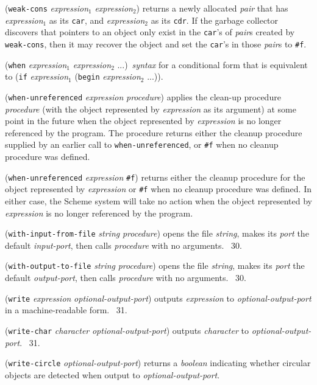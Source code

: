 \documentclass[10pt,twocolumn]{article}
\begin{document}
(\texttt{weak-cons} \emph{expression}$_1$ \emph{expression}$_2$)
returns a newly allocated \emph{pair} that has \emph{expression}$_1$
as its \texttt{car}, and \emph{expression}$_2$ as its \texttt{cdr}.
If the garbage collector discovers that pointers to an object only
exist in the \texttt{car}'s of \emph{pair}s created by
\texttt{weak-cons}, then it may recover the object and set the
\texttt{car}'s in those \emph{pair}s to \texttt{\#f}.

(\texttt{when} \emph{expression}$_1$ \emph{expression}$_2$
...)\ \emph{syntax} for a conditional form that is equivalent to
(\texttt{if} \emph{expression}$_1$ (\texttt{begin}
\emph{expression}$_2$ ...)).

(\texttt{when-unreferenced} \emph{expression} \emph{procedure})
applies the clean-up procedure \emph{procedure} (with the object
represented by \emph{expression} as its argument) at some point in the
future when the object represented by \emph{expression} is no longer
referenced by the program.  The procedure returns either the cleanup
procedure supplied by an earlier call to \texttt{when-unreferenced},
or \texttt{\#f} when no cleanup procedure was defined.

(\texttt{when-unreferenced} \emph{expression} \texttt{\#f}) returns
either the cleanup procedure for the object represented by
\emph{expression} or \texttt{\#f} when no cleanup procedure was
defined.  In either case, the Scheme system will take no action when
the object represented by \emph{expression} is no longer referenced by
the program.

(\texttt{with-input-from-file} \emph{string} \emph{procedure}) opens
the file \emph{string}, makes its \emph{port} the default
\emph{input-port}, then calls \emph{procedure} with no arguments.
\RRRRRS~30.

(\texttt{with-output-to-file} \emph{string} \emph{procedure}) opens
the file \emph{string}, makes its \emph{port} the default
\emph{output-port}, then calls \emph{procedure} with no arguments.
\RRRRRS~30.

(\texttt{write} \emph{expression} \emph{optional-output-port}) outputs
\emph{expression} to \emph{optional-output-port} in a machine-readable
form.  \RRRRRS~31.

(\texttt{write-char} \emph{character} \emph{optional-output-port})
outputs \emph{character} to \emph{optional-output-port}.  \RRRRRS~31.

(\texttt{write-circle} \emph{optional-output-port}) returns a
\emph{boolean} indicating whether circular objects are detected when
output to \emph{optional-output-port}.
\end{document}
